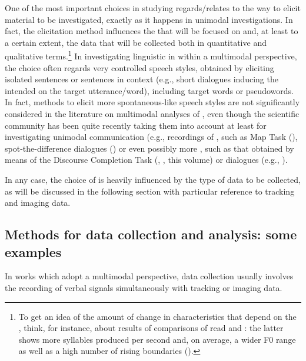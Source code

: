 \documentclass[output=paper]{langsci/langscibook}
\begin{document}
One of the most important choices in studying  regards\slash relates to the way to elicit material to be investigated, exactly as it happens in unimodal investigations. In fact, the elicitation method influences the  that will be focused on and, at least to a certain extent, the data that will be collected both in quantitative and qualitative terms.\footnote{To get an idea of the amount of change in  characteristics that depend on the , think, for instance, about results of comparisons of read and : the latter shows more syllables produced per second and, on average, a wider F0 range \citep{Blaauw1995} as well as a high number of rising boundaries (\citealt{Ayers1994,Blaauw1995}).} In investigating linguistic  in  within a multimodal perspective, the choice often regards very controlled speech styles, obtained by eliciting isolated sentences or sentences in context (e.g., short dialogues inducing the intended  on the target utterance\slash word), including target words or pseudowords. In fact, methods to elicit more spontaneous-like speech styles are not significantly considered in the literature on multimodal analyses of , even though the scientific community has been quite recently taking them into account at least for investigating unimodal communication (e.g.,  recordings of , such as Map Task (\citealt{Brown1983,Anderson1991}), spot-the-difference dialogues (\citealt{Savy2009,Pean.1993}) or even possibly more , such as that obtained by means of the Discourse Completion Task (\citealt{BlumKulka1989}, \citeauthor{Vanrell.2018}, this volume) or dialogues (e.g., \citealt{Geng2013}). 

In any case, the choice of  is heavily influenced by the type of data to be collected, as  will be discussed in the following section with particular reference to tracking and imaging data.


 
\subsection{Methods for data collection and analysis: some examples} \label{sec:gil:2:2}


In works which adopt a multimodal perspective, data collection usually involves the recording of verbal signals simultaneously with tracking or imaging data. 
\end{document}
